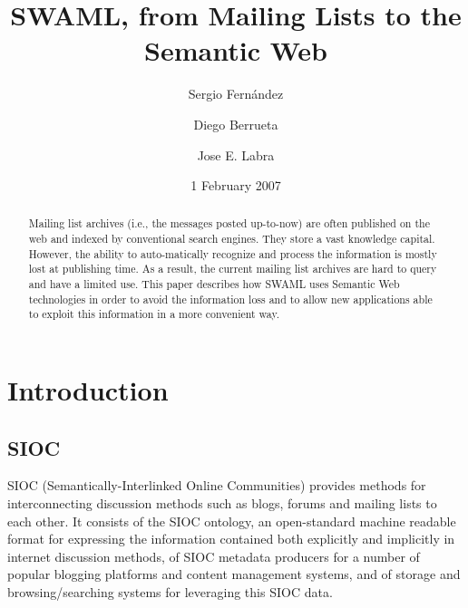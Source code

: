\documentclass{llncs}
\begin{document}
\title{SWAML, from Mailing Lists to the Semantic Web}



\author{
Sergio Fern\'andez \and Diego Berrueta \and Jose E. Labra
}




\date{1 February 2007}

\maketitle


\begin{abstract}

Mailing list archives (i.e., the messages posted up-to-now) are often published 
on the web and indexed by conventional search engines. They store a vast 
knowledge capital. However, the ability to auto-matically recognize and process 
the information is mostly lost at publishing time. As a result, the current 
mailing list archives are hard to query and have a limited use. This paper 
describes how SWAML uses Semantic Web technologies in order to avoid the
information loss and to allow new applications able to exploit this 
information in a more convenient way.

\end{abstract}

\section{Introduction}

\cite{Luke2004}

\subsection{SIOC}

SIOC (Semantically-Interlinked Online Communities) provides methods for 
interconnecting discussion methods such as blogs, forums and mailing lists 
to each other. It consists of the SIOC ontology, an open-standard machine 
readable format for expressing the information contained both explicitly 
and implicitly in internet discussion methods, of SIOC metadata producers 
for a number of popular blogging platforms and content management systems, 
and of storage and browsing/searching systems for leveraging this SIOC 
data. \cite{Breslin2005}
\end{document}
